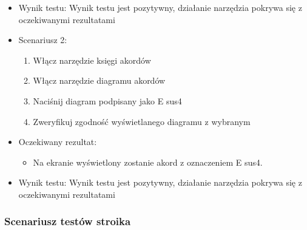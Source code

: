 \begin{itemize}
\begin{itemize}
        \end{itemize}
    \item Wynik testu: Wynik testu jest pozytywny, działanie narzędzia pokrywa się z oczekiwanymi rezultatami
    \item Scenariusz 2:
        \begin{enumerate}
            \item Włącz narzędzie księgi akordów
            \item Włącz narzędzie diagramu akordów
            \item Naciśnij diagram podpisany jako E sus4
            \item Zweryfikuj zgodność wyświetlanego diagramu z wybranym
        \end{enumerate}
    \item Oczekiwany rezultat:
        \begin{itemize}
            \item Na ekranie wyświetlony zostanie akord z oznaczeniem E sus4.
        \end{itemize}
    \item Wynik testu: Wynik testu jest pozytywny, działanie narzędzia pokrywa się z oczekiwanymi rezultatami
\end{itemize}

\subsubsection{Scenariusz testów stroika}

